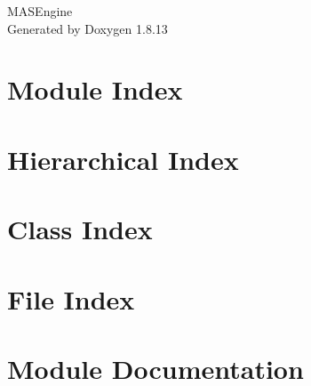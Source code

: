 \documentclass[twoside]{book}
\newcommand{\+}{\discretionary{\mbox{\scriptsize$\hookleftarrow$}}{}{}}
\newcommand{\clearemptydoublepage}{%
  \newpage{\pagestyle{empty}\cleardoublepage}%
}
\begin{document}
\hypersetup{pageanchor=false,
             bookmarksnumbered=true,
             pdfencoding=unicode
            }
\begin{titlepage}
\vspace*{7cm}
\begin{center}%
{\Large M\+A\+S\+Engine }\\
\vspace*{1cm}
{\large Generated by Doxygen 1.8.13}\\
\end{center}
\end{titlepage}
\clearemptydoublepage
{}
\tableofcontents
\clearemptydoublepage
{}
\hypersetup{pageanchor=true}

\chapter{Module Index}

\chapter{Hierarchical Index}

\chapter{Class Index}

\chapter{File Index}

\chapter{Module Documentation}
























\end{document}
